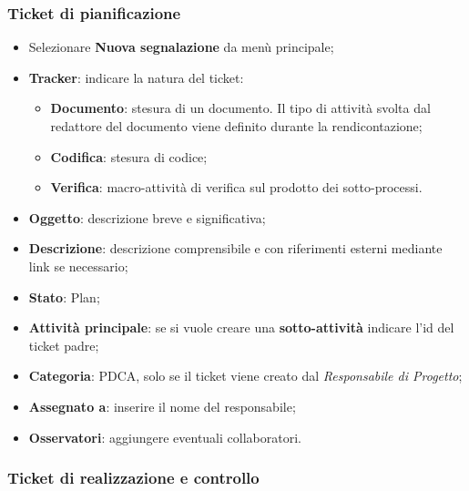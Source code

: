 \subsubsection{Ticket di pianificazione}

\begin{itemize}


\item Selezionare \textbf{Nuova segnalazione} da men\`{u} principale; 
\item \textbf{Tracker}: indicare la natura del ticket: 
	\begin{itemize}
	\item \textbf{Documento}: stesura di un documento. Il tipo di attivit\`{a} svolta dal redattore del documento viene definito durante la rendicontazione; 
	\item \textbf{Codifica}: stesura di codice; 
	\item \textbf{Verifica}: macro-attivit\`{a} di verifica sul prodotto dei sotto-processi. 


	\end{itemize}

\item \textbf{Oggetto}: descrizione breve e significativa; 
\item \textbf{Descrizione}: descrizione comprensibile e con riferimenti esterni mediante link se necessario; 
\item \textbf{Stato}: Plan; 
\item \textbf{Attivit\`{a} principale}: se si vuole creare una \textbf{sotto-attivit\`{a}} indicare l’id del ticket 
padre; 
\item \textbf{Categoria}: PDCA, solo se il ticket viene creato dal \emph{Responsabile di Progetto}; 
\item \textbf{Assegnato a}: inserire il nome del responsabile; 
\item \textbf{Osservatori}: aggiungere eventuali collaboratori.
\end{itemize}  


\subsubsection{Ticket di realizzazione e controllo} 

